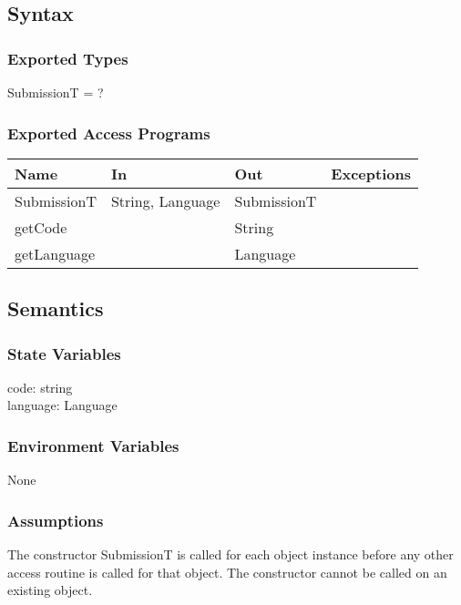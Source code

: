 \documentclass[12pt, titlepage]{article}
\begin{document}
\subsection{Syntax}

\subsubsection{Exported Types}

SubmissionT = ?

\subsubsection{Exported Access Programs}

\begin{center}
\begin{tabular}{ |  p{4cm} | p{3cm} |  p{3cm} | p{4cm} | }
\hline
\textbf{Name} & \textbf{In} & \textbf{Out} & \textbf{Exceptions} \\
\hline
SubmissionT & String, Language & SubmissionT & \\
getCode & & String & \\
getLanguage & & Language & \\

\hline
\end{tabular}
\end{center}

\subsection{Semantics}

\subsubsection{State Variables}

code: string\\
language: Language

\subsubsection{Environment Variables}
None

\subsubsection{Assumptions}
The constructor SubmissionT is called for each object instance before any other access routine is called for that object. The constructor cannot be called on an existing object.
\end{document}
